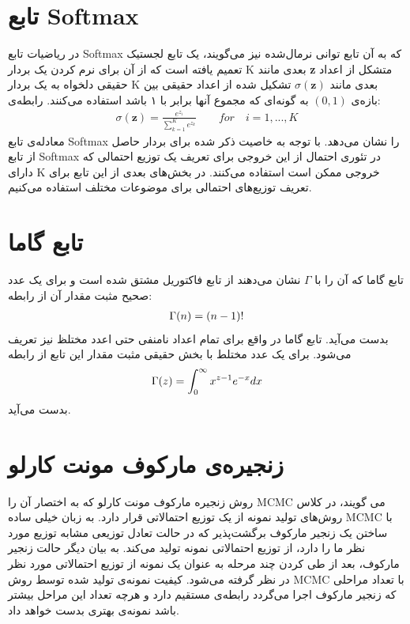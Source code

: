 \section{تابع Softmax}
\label{chap2sec9}
در ریاضیات تابع
Softmax
که به آن تابع توانی‌ نرمال‌شده
 نیز می‌‌گویند، یک تابع لجستیک تعمیم یافته است که از آن برای نرم کردن یک بردار
K
بعدی مانند
\textbf{z}
متشکل از اعداد حقیقی‌ دلخواه به یک بردار
K
بعدی مانند
$\sigma(\textbf{z})$ 
تشکیل شده از اعداد حقیقی‌ بین بازه‌ی
$(0,1)$
به گونه‌ای که مجموع آنها برابر با ۱ باشد استفاده می‌‌کنند. رابطه‌ی:
\begin{align}
	\sigma(\textbf{z}) = \frac{e^{z_i}}{\sum_{k=1}^{K}e^{z_k}} \quad\quad for\quad i = 1, ..., K
	\label{eq2}
\end{align}
معادله‌ی تابع
Softmax
را نشان می‌‌دهد. با توجه به خاصیت ذکر شده برای بردار حاصل از تابع
Softmax
در تئوری احتمال از این خروجی برای تعریف یک توزیع احتمالی که دارای
K
خروجی ممکن است استفاده می‌کنند. در بخش‌های بعدی از این تابع برای تعریف توزیع‌های احتمالی‌ برای موضوعات مختلف استفاده می‌‌کنیم.


\section{تابع گاما}
\label{chap2sec8}
تابع گاما
 که آن را با
$\Gamma$
نشان می‌‌دهند از تابع فاکتوریل مشتق شده است و برای یک عدد صحیح مثبت مقدار آن از رابطه:
\begin{align}
	\centering
	\label{eq13}
	\Gamma(n) = (n-1)!
\end{align}
بدست می‌‌آید. تابع گاما در واقع برای تمام اعداد نامنفی حتی اعدد مختلظ نیز تعریف می‌‌شود. برای یک عدد مختلط با بخش حقیقی مثبت مقدار این تابع از رابطه
\begin{align}
	\centering
	\label{eq14}
	\Gamma(z) = \int_{0}^{\infty} x^{z-1}e^{-x}dx
\end{align}
بدست می‌‌آید.

\section{زنجیره‌ی مارکوف مونت کارلو}
\label{chap2sec6}
روش زنجیره‌ مارکوف مونت کارلو
 که به اختصار آن را
MCMC
می‌ گویند، در کلاس روش‌های تولید نمونه از یک توزیع احتمالاتی قرار دارد. به زبان خیلی‌ ساده
MCMC
با ساختن یک زنجیر مارکوف برگشت‌پذیر
که در حالت تعادل توزیعی مشابه توزیع مورد نظر ما را دارد، از توزیع احتمالاتی نمونه تولید می‌‌کند. به بیان دیگر حالت زنجیر مارکوف، بعد از طی‌ کردن چند مرحله به عنوان یک نمونه از توزیع احتمالاتی مورد نظر در نظر گرفته می‌شود. کیفیت نمونه‌‌ی تولید شده توسط روش
MCMC
با تعداد مراحلی که زنجیر مارکوف اجرا می‌‌گردد رابطه‌ی مستقیم دارد و هرچه تعداد این مراحل بیشتر باشد نمونه‌ی بهتری بدست خواهد داد.

